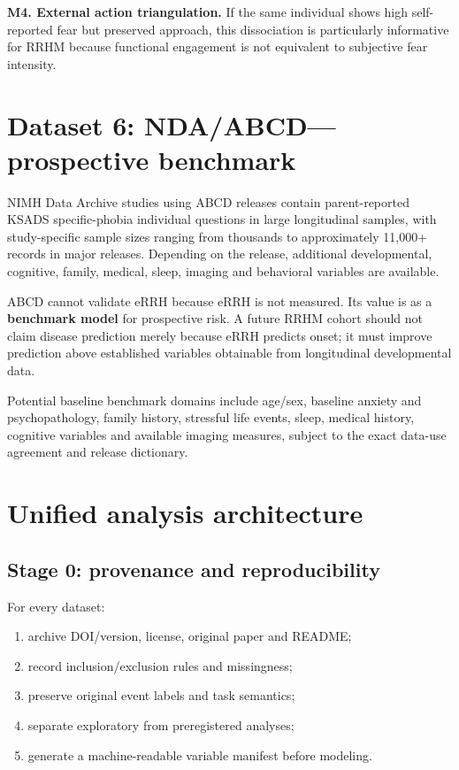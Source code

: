 \documentclass[11pt]{article}
\begin{document}
\textbf{M4. External action triangulation.} If the same individual shows high self-reported fear but preserved approach, this dissociation is particularly informative for RRHM because functional engagement is not equivalent to subjective fear intensity.

\section{Dataset 6: NDA/ABCD---prospective benchmark}

NIMH Data Archive studies using ABCD releases contain parent-reported KSADS specific-phobia individual questions in large longitudinal samples, with study-specific sample sizes ranging from thousands to approximately 11,000+ records in major releases. Depending on the release, additional developmental, cognitive, family, medical, sleep, imaging and behavioral variables are available.

ABCD cannot validate eRRH because eRRH is not measured. Its value is as a \textbf{benchmark model} for prospective risk. A future RRHM cohort should not claim disease prediction merely because eRRH predicts onset; it must improve prediction above established variables obtainable from longitudinal developmental data.

Potential baseline benchmark domains include age/sex, baseline anxiety and psychopathology, family history, stressful life events, sleep, medical history, cognitive variables and available imaging measures, subject to the exact data-use agreement and release dictionary.

\section{Unified analysis architecture}

\subsection{Stage 0: provenance and reproducibility}
For every dataset:
\begin{enumerate}[leftmargin=2em]
\item archive DOI/version, license, original paper and README;
\item record inclusion/exclusion rules and missingness;
\item preserve original event labels and task semantics;
\item separate exploratory from preregistered analyses;
\item generate a machine-readable variable manifest before modeling.
\end{enumerate}
\end{document}
